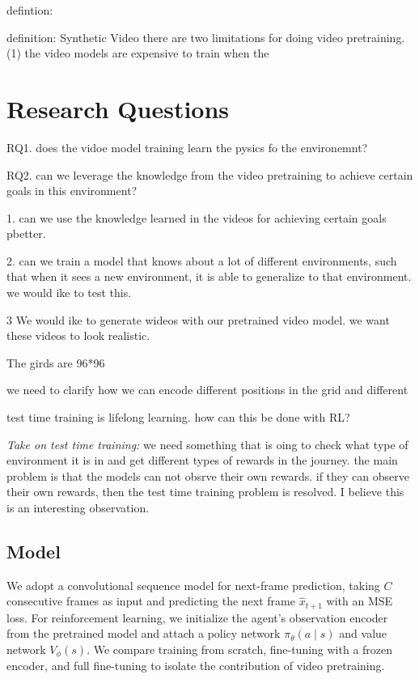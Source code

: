 defintion:


definition: Synthetic Video
there are two limitations for doing video pretraining. (1) the video models are expensive to train when the 


\section{Research Questions}

RQ1. does the vidoe model training learn the pysics fo the environemnt?

RQ2. can we leverage the knowledge from the video pretraining to achieve certain goals in this environment?



1. can we use the knowledge learned in the videos for achieving certain goals pbetter. 


2. can we train a model that knows about a lot of different environments, such that when it sees a new environment, it is able to generalize to that environment. we would ike to test this. 


3 We would ike to generate wideos with our pretrained video model. we want these videos to look realistic.


The girds are 96*96


we need to clarify how we can encode different positions in the grid and different 


test time training is lifelong learning. how can this be done with RL?

\textit{Take on test time training:} we need something that is oing to check what type of environment it is in and get different types of rewards in the journey. the main problem is that the models can not obsrve their own rewards. if they can observe their own rewards, then the test time training problem is resolved.  I believe this is an interesting observation. 





\subsection{Model}

We adopt a convolutional sequence model for next-frame prediction, taking $C$ consecutive frames as input and predicting the next frame $\hat{x}_{t+1}$ with an MSE loss. For reinforcement learning, we initialize the agent's observation encoder from the pretrained model and attach a policy network $\pi_\theta(a \mid s)$ and value network $V_\phi(s)$. We compare training from scratch, fine-tuning with a frozen encoder, and full fine-tuning to isolate the contribution of video pretraining.



